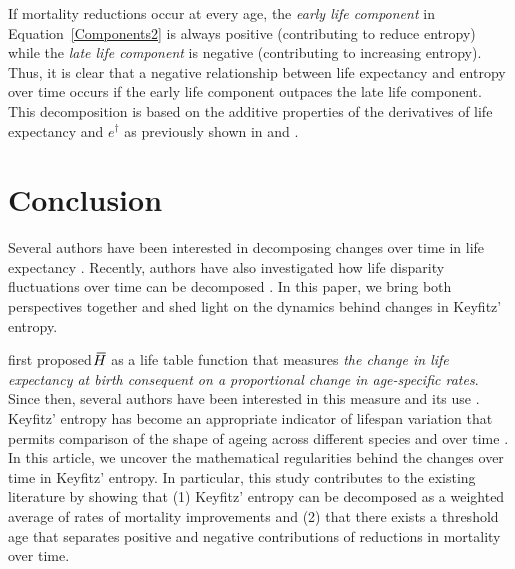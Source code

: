 \documentclass[a4paper,twoside, openright, 12pt, leqno]{article}
\newcommand*\xbar[1]{%
   \hbox{%
     \vbox{%
       \hrule height 0.5pt %
       \kern0.3ex%
       \hbox{%
         \kern-0.25em%
         \ensuremath{#1}%
         \kern-0.05em%
       }%
     }%
   }%
}
\begin{document}
If mortality reductions occur at every age, the \textit{early life component} in Equation~\eqref{Components2} is always positive (contributing to reduce entropy) while the \textit{late life component} is negative (contributing to increasing entropy). Thus, it is clear that a negative relationship between life expectancy and entropy over time occurs if the early life component outpaces the late life component. This decomposition is based on the additive properties of the derivatives of life expectancy and $e^\dagger$ as previously shown in \citet{Vaupel2003} and \citet{Fernandez2015}. 



\section{Conclusion}
 Several authors have been interested in decomposing changes over time in life expectancy \citep{arriaga1984measuring, Vaupel1986, pollard1988decomposition, Vaupel2003, beltran2008integrated, beltran2011unifying}. Recently, authors have also investigated how life disparity fluctuations over time can be decomposed \citep{Wagner2010, Zhang2009, Shkolnikov2011, Aburto2018Eastern, aburto2019upsurge}. In this paper, we bring both perspectives together and shed light on the dynamics behind changes in Keyfitz' entropy.
   
 \cite{Keyfitz1977} first proposed $\xbar{H}$ as a life table function that measures \textit{the change in life expectancy at birth consequent on a proportional change in age-specific rates}. Since then, several authors have been interested in this measure and its use \citep{demetrius1978adaptive, Demetrius1979,mitra1978short,Goldman1986,Vaupel1986,Hakkert1987,hill1993entropy,Fernandez2015}. Keyfitz' entropy has become an appropriate indicator of lifespan variation that permits comparison of the shape of ageing across different species and over time \citep{baudisch2013pace,Wrycza2015}. In this article, we uncover the mathematical regularities behind the changes over time in Keyfitz' entropy. In particular, this study contributes to the existing literature by showing that (1) Keyfitz' entropy can be decomposed as a weighted average of rates of mortality improvements and (2) that there exists a threshold age that separates positive and negative contributions of reductions in mortality over time. 
\end{document}
